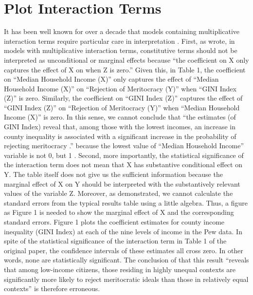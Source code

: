 
\section{Plot Interaction Terms}

It has been well known for over a decade that models containing multiplicative interaction terms require particular care in interpretation \citep[see, e.g.,][]{Golder2003, Braumoeller2004, Brambor2006, Kam2007}. First, as \citet{Brambor, Clark, and Golder2006, 71-72} wrote, in models with multiplicative interaction terms, constitutive terms should not be interpreted as unconditional or marginal effects because “the coeﬃcient on X only captures the eﬀect of X on when Z is zero.” Given this, in Table 1, the coefficient on “Median Household Income (X)” only captures the effect of “Median Household Income (X)” on “Rejection of Meritocracy (Y)” when “GINI Index (Z)” is zero. Similarly, the coefficient on “GINI Index (Z)” captures the effect of “GINI Index (Z)” on “Rejection of Meritocracy (Y)” when “Median Household Income (X)” is zero. In this sense, we cannot conclude that “the estimates (of GINI Index) reveal that, among those with the lowest incomes, an increase in county inequality is associated with a significant increase in the probability of rejecting meritocracy \citep{Newman, Johnston, and Lown2015a, 334}.” because the lowest value of “Median Household Income” variable is not 0, but 1 \citep{Newman, Johnston, and Lown2015a, 332}. 
Second, more importantly, the statistical significance of the interaction term does not mean that X has substantive conditional effect on Y. The table itself does not give us the sufficient information because the marginal effect of X on Y should be interpreted with the substantively relevant values of the variable Z. Moreover, as \citet{Brambor, Clark, and Golder2006, 74} demonstrated, we cannot calculate the standard errors from the typical results table using a little algebra. Thus, a figure as Figure 1 is needed to show the marginal effect of X and the corresponding standard errors. Figure 1 plots the coeﬃcient estimates for county income inequality (GINI Index) at each of the nine levels of income in the Pew data. In spite of the statistical significance of the interaction term in Table 1 of the original paper, the conﬁdence intervals of these estimates all cross zero. In other words, none are statistically signiﬁcant. The conclusion of \citet{Newman, Johnston, and Lown2015a, 334} that this result “reveals that among low-income citizens, those residing in highly unequal contexts are signiﬁcantly more likely to reject meritocratic ideals than those in relatively equal contexts” is therefore erroneous.
